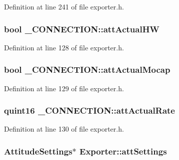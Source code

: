 \-Definition at line 241 of file exporter.\-h.

\hypertarget{group___mo_cap_plugin_ga4d9a7f3563731377f2905f1b18e17d52}{
\subsubsection[{att\-Actual\-H\-W}]{\setlength{\rightskip}{0pt plus 5cm}bool {\bf \-\_\-\-C\-O\-N\-N\-E\-C\-T\-I\-O\-N\-::att\-Actual\-H\-W}}}\label{group___mo_cap_plugin_ga4d9a7f3563731377f2905f1b18e17d52}


\-Definition at line 128 of file exporter.\-h.

\hypertarget{group___mo_cap_plugin_gacd70b3a85672be0f8311fc107768c93f}{
\subsubsection[{att\-Actual\-Mocap}]{\setlength{\rightskip}{0pt plus 5cm}bool {\bf \-\_\-\-C\-O\-N\-N\-E\-C\-T\-I\-O\-N\-::att\-Actual\-Mocap}}}\label{group___mo_cap_plugin_gacd70b3a85672be0f8311fc107768c93f}


\-Definition at line 129 of file exporter.\-h.

\hypertarget{group___mo_cap_plugin_ga14fb71ed2eb43b817ee157f6cdcb84eb}{
\subsubsection[{att\-Actual\-Rate}]{\setlength{\rightskip}{0pt plus 5cm}quint16 {\bf \-\_\-\-C\-O\-N\-N\-E\-C\-T\-I\-O\-N\-::att\-Actual\-Rate}}}\label{group___mo_cap_plugin_ga14fb71ed2eb43b817ee157f6cdcb84eb}


\-Definition at line 130 of file exporter.\-h.

\hypertarget{group___mo_cap_plugin_gaa7be67cf3fe5bd561bfd56b81ace46d6}{
\subsubsection[{att\-Settings}]{\setlength{\rightskip}{0pt plus 5cm}\-Attitude\-Settings$\ast$ {\bf \-Exporter\-::att\-Settings}}}\label{group___mo_cap_plugin_gaa7be67cf3fe5bd561bfd56b81ace46d6}


